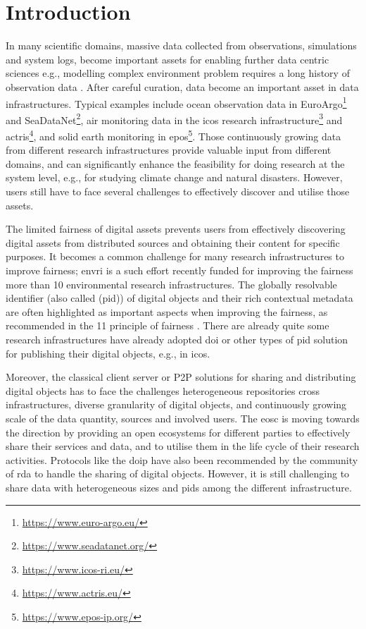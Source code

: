 \documentclass[conference]{IEEEtran}
\begin{document}
\section{Introduction}
In many scientific domains, massive data collected from observations, simulations and system logs, become important assets for enabling further data centric sciences e.g., modelling complex environment problem requires a long history of observation data \cite{}. After careful curation, data become an important asset in data infrastructures. Typical examples include ocean observation data in EuroArgo\footnote{\url{https://www.euro-argo.eu/}} and SeaDataNet\footnote{\url{https://www.seadatanet.org/}}, air monitoring data in the \gls{icos} research infrastructure\footnote{\url{https://www.icos-ri.eu/}} and \gls{actris}\footnote{\url{https://www.actris.eu/}}, and solid earth monitoring in \gls{epos}\footnote{\url{https://www.epos-ip.org/}}. Those continuously growing data from different research infrastructures provide valuable input from different domains, and can significantly enhance the feasibility for doing research at the system level, e.g., for studying climate change and natural disasters. However, users still have to face several challenges to effectively discover and utilise those assets.

The limited \gls{fairness} of digital assets prevents users from effectively discovering digital assets from distributed sources and obtaining their content for specific purposes. It becomes a common challenge for many research infrastructures to improve \gls{fairness}; \gls{envri} is a such effort recently funded for improving the \gls{fairness} more than 10 environmental research infrastructures. The globally resolvable identifier (also called (\gls{pid})) of digital objects and their rich contextual metadata are often highlighted as important aspects when improving the \gls{fairness}, as recommended in the 11 principle of \gls{fairness} \cite{}. There are already quite some research infrastructures have already adopted \gls{doi} or other types of \gls{pid} solution for publishing their digital objects, e.g., in \gls{icos}.

Moreover, the classical client server or P2P solutions for sharing and distributing digital objects has to face the challenges heterogeneous repositories cross infrastructures, diverse granularity of digital objects, and continuously growing scale of the data quantity, sources and involved users. The \gls{eosc} is moving towards the direction by providing an open ecosystems for different parties to effectively share their services and data, and to utilise them in the life cycle of their research activities. Protocols like the \gls{doip} have also been recommended by the community of \gls{rda} to handle the sharing of digital objects. However, it is still challenging to share data with heterogeneous sizes and \glspl{pid} among the different infrastructure.
\end{document}
